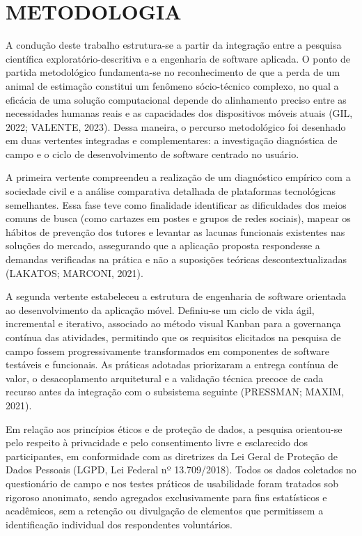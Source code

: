 \section{METODOLOGIA}

A condução deste trabalho estrutura-se a partir da integração entre a pesquisa científica exploratório-descritiva e a engenharia de software aplicada. O ponto de partida metodológico fundamenta-se no reconhecimento de que a perda de um animal de estimação constitui um fenômeno sócio-técnico complexo, no qual a eficácia de uma solução computacional depende do alinhamento preciso entre as necessidades humanas reais e as capacidades dos dispositivos móveis atuais (GIL, 2022; VALENTE, 2023). Dessa maneira, o percurso metodológico foi desenhado em duas vertentes integradas e complementares: a investigação diagnóstica de campo e o ciclo de desenvolvimento de software centrado no usuário.

A primeira vertente compreendeu a realização de um diagnóstico empírico com a sociedade civil e a análise comparativa detalhada de plataformas tecnológicas semelhantes. Essa fase teve como finalidade identificar as dificuldades dos meios comuns de busca (como cartazes em postes e grupos de redes sociais), mapear os hábitos de prevenção dos tutores e levantar as lacunas funcionais existentes nas soluções do mercado, assegurando que a aplicação proposta respondesse a demandas verificadas na prática e não a suposições teóricas descontextualizadas (LAKATOS; MARCONI, 2021).

A segunda vertente estabeleceu a estrutura de engenharia de software orientada ao desenvolvimento da aplicação móvel. Definiu-se um ciclo de vida ágil, incremental e iterativo, associado ao método visual Kanban para a governança contínua das atividades, permitindo que os requisitos elicitados na pesquisa de campo fossem progressivamente transformados em componentes de software testáveis e funcionais. As práticas adotadas priorizaram a entrega contínua de valor, o desacoplamento arquitetural e a validação técnica precoce de cada recurso antes da integração com o subsistema seguinte (PRESSMAN; MAXIM, 2021).

Em relação aos princípios éticos e de proteção de dados, a pesquisa orientou-se pelo respeito à privacidade e pelo consentimento livre e esclarecido dos participantes, em conformidade com as diretrizes da Lei Geral de Proteção de Dados Pessoais (LGPD, Lei Federal nº 13.709/2018). Todos os dados coletados no questionário de campo e nos testes práticos de usabilidade foram tratados sob rigoroso anonimato, sendo agregados exclusivamente para fins estatísticos e acadêmicos, sem a retenção ou divulgação de elementos que permitissem a identificação individual dos respondentes voluntários.

